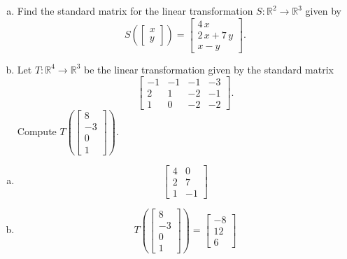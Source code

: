 
\begin{exerciseStatement}

\begin{enumerate}[(a)]
\item Find the standard matrix for the linear transformation \(S:\mathbb{R}^ 2  \to \mathbb{R}^ 3 \) given by \[S\left(  \left[\begin{array}{c}
x \\
y
\end{array}\right]  \right) =  \left[\begin{array}{c}
4 \, x \\
2 \, x + 7 \, y \\
x - y
\end{array}\right] .\]
\item Let \(T:\mathbb{R}^ 4  \to \mathbb{R}^ 3 \) be the linear transformation given by the standard matrix \[ \left[\begin{array}{cccc}
-1 & -1 & -1 & -3 \\
2 & 1 & -2 & -1 \\
1 & 0 & -2 & -2
\end{array}\right] .\] Compute \(T\left( \left[\begin{array}{c}
8 \\
-3 \\
0 \\
1
\end{array}\right]  \right)\). 
\end{enumerate}
    
\end{exerciseStatement}
    
\begin{exerciseAnswer} 

\begin{enumerate}[(a)]
\item \[ \left[\begin{array}{cc}
4 & 0 \\
2 & 7 \\
1 & -1
\end{array}\right] \]
\item \[T\left( \left[\begin{array}{c}
8 \\
-3 \\
0 \\
1
\end{array}\right]  \right)= \left[\begin{array}{c}
-8 \\
12 \\
6
\end{array}\right] \]
\end{enumerate}
    
\end{exerciseAnswer}
    
